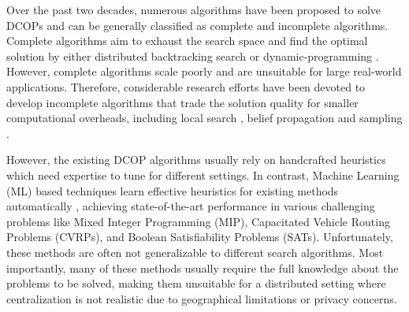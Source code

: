 \documentclass[letterpaper]{article} %
\begin{document}
Over the past two decades, numerous algorithms have been proposed to solve DCOPs and can be generally classified as complete and incomplete algorithms. Complete algorithms aim to exhaust the search space and find the optimal solution by either distributed backtracking search \cite{hirayamay97,modi2005adopt,litov2017forward,yeoh2010bnb} or dynamic-programming \cite{chen2020rmb,petcuscalable,petcu2007mb}. However, complete algorithms scale poorly and are unsuitable for large real-world applications. Therefore, considerable research efforts have been devoted to develop incomplete algorithms that trade the solution quality for smaller computational overheads, including local search \cite{maheswaran2004distributed,okamoto2016distributed,Zhang2005Distributed}, belief propagation \cite{cohen2020governing,farinelli2008decentralised,rogers2011bounded,zivan2017balancing,chenDWH18} and sampling \cite{nguyen2019distributed,ottens2017duct}.

However, the existing DCOP algorithms usually rely on handcrafted heuristics which need expertise to tune for different settings. In contrast, Machine Learning (ML) based techniques learn effective heuristics for existing methods automatically \cite{bengio2021machine,gasseCFC019,Lederman2020Learning}, achieving state-of-the-art performance in various challenging problems like Mixed Integer Programming (MIP), Capacitated Vehicle Routing Problems (CVRPs), and Boolean Satisfiability Problems (SATs). Unfortunately, these methods are often not generalizable to different search algorithms. Most importantly, many of these methods usually require the full knowledge about the problems to be solved, making them unsuitable for a distributed setting where centralization is not realistic due to geographical limitations or privacy concerns.
\end{document}
